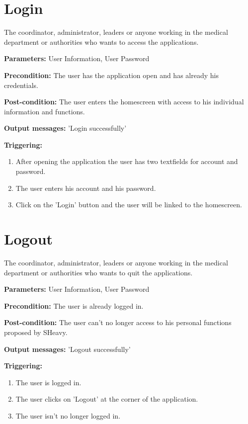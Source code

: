 \section{Login}
\label{operation:Login}
The coordinator, administrator, leaders or anyone working in the medical
department or authorities who wants to access the applications.\\
\begin{description}
\item \textbf{Parameters:} User Information, User Password
\item \textbf{Precondition:} The user has the application open and has already
his credentials.
\item \textbf{Post-condition:}  The user enters the homescreen with access to
his individual information and functions.
\item \textbf{Output messages:} 'Login successfully'
\item \textbf{Triggering:}
\begin{enumerate}
\item After opening the application the user has two textfields for account and
password.
\item The user enters his account and his password.
\item Click on the 'Login' button and the user will be linked to the homescreen.
\end{enumerate}
\end{description}

\section{Logout}
\label{operation:Logout}
The coordinator, administrator, leaders or anyone working in the medical
department or authorities who wants to quit the applications.\\
\begin{description}
\item \textbf{Parameters:} User Information, User Password
\item \textbf{Precondition:} The user is already logged in.
\item \textbf{Post-condition:}  The user can't no longer access to his personal
functions proposed by SHeavy.
\item \textbf{Output messages:} 'Logout successfully'
\item \textbf{Triggering:}
\begin{enumerate}
\item The user is logged in.
\item The user clicks on 'Logout' at the corner of the application.
\item The user isn't no longer logged in.
\end{enumerate}
\end{description}

